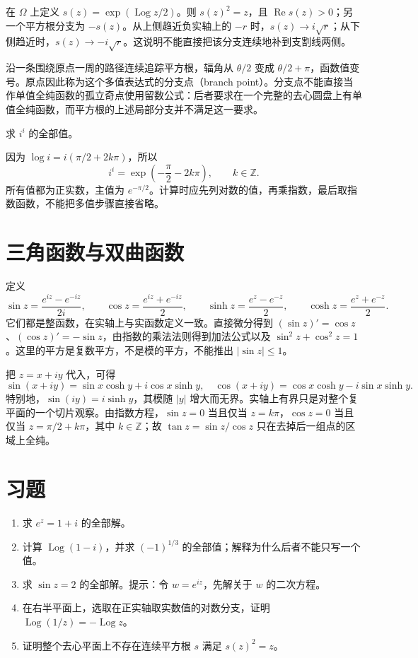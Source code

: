 \documentclass[UTF8,12pt,a4paper,fontset=fandol]{ctexbook}
\begin{document}
\begin{example}[平方根分支]
在 $\Omega$ 上定义 $s(z)=\exp(\operatorname{Log}z/2)$。则 $s(z)^2=z$，且 $\operatorname{Re}s(z)>0$；另一个平方根分支为 $-s(z)$。从上侧趋近负实轴上的 $-r$ 时，$s(z)\to i\sqrt r$；从下侧趋近时，$s(z)\to-i\sqrt r$。这说明不能直接把该分支连续地补到支割线两侧。
\end{example}

沿一条围绕原点一周的路径连续追踪平方根，辐角从 $\theta/2$ 变成 $\theta/2+\pi$，函数值变号。原点因此称为这个多值表达式的分支点（branch point）。分支点不能直接当作单值全纯函数的孤立奇点使用留数公式：后者要求在一个完整的去心圆盘上有单值全纯函数，而平方根的上述局部分支并不满足这一要求。

\begin{example}[复数幂也可能取实数值]
求 $i^i$ 的全部值。
\end{example}
\begin{solve}
因为 $\log i=i(\pi/2+2k\pi)$，所以
\[
 i^i=\exp\left(-\frac\pi2-2k\pi\right),\qquad k\in\mathbb Z.
\]
所有值都为正实数，主值为 $e^{-\pi/2}$。计算时应先列对数的值，再乘指数，最后取指数函数，不能把多值步骤直接省略。
\end{solve}

\section{三角函数与双曲函数}

定义
\[
 \sin z=\frac{e^{iz}-e^{-iz}}{2i},\qquad
 \cos z=\frac{e^{iz}+e^{-iz}}2,
 \qquad
 \sinh z=\frac{e^z-e^{-z}}2,\qquad
 \cosh z=\frac{e^z+e^{-z}}2.
\]
它们都是整函数，在实轴上与实函数定义一致。直接微分得到 $(\sin z)'=\cos z$、$(\cos z)'=-\sin z$，由指数的乘法法则得到加法公式以及 $\sin^2z+\cos^2z=1$。这里的平方是复数平方，不是模的平方，不能推出 $|\sin z|\le1$。

把 $z=x+iy$ 代入，可得
\[
 \sin(x+iy)=\sin x\cosh y+i\cos x\sinh y,
 \quad
 \cos(x+iy)=\cos x\cosh y-i\sin x\sinh y.
\]
特别地，$\sin(iy)=i\sinh y$，其模随 $|y|$ 增大而无界。实轴上有界只是对整个复平面的一个切片观察。由指数方程，$\sin z=0$ 当且仅当 $z=k\pi$，$\cos z=0$ 当且仅当 $z=\pi/2+k\pi$，其中 $k\in\mathbb Z$；故 $\tan z=\sin z/\cos z$ 只在去掉后一组点的区域上全纯。

\section{习题}
\label{sec:cv-elementary-ex}
\begin{enumerate}
 \item 求 $e^z=1+i$ 的全部解。
 \item 计算 $\operatorname{Log}(1-i)$，并求 $(-1)^{1/3}$ 的全部值；解释为什么后者不能只写一个值。
 \item 求 $\sin z=2$ 的全部解。提示：令 $w=e^{iz}$，先解关于 $w$ 的二次方程。
 \item 在右半平面上，选取在正实轴取实数值的对数分支，证明 $\operatorname{Log}(1/z)=-\operatorname{Log}z$。
 \item 证明整个去心平面上不存在连续平方根 $s$ 满足 $s(z)^2=z$。
\end{enumerate}
\end{document}
